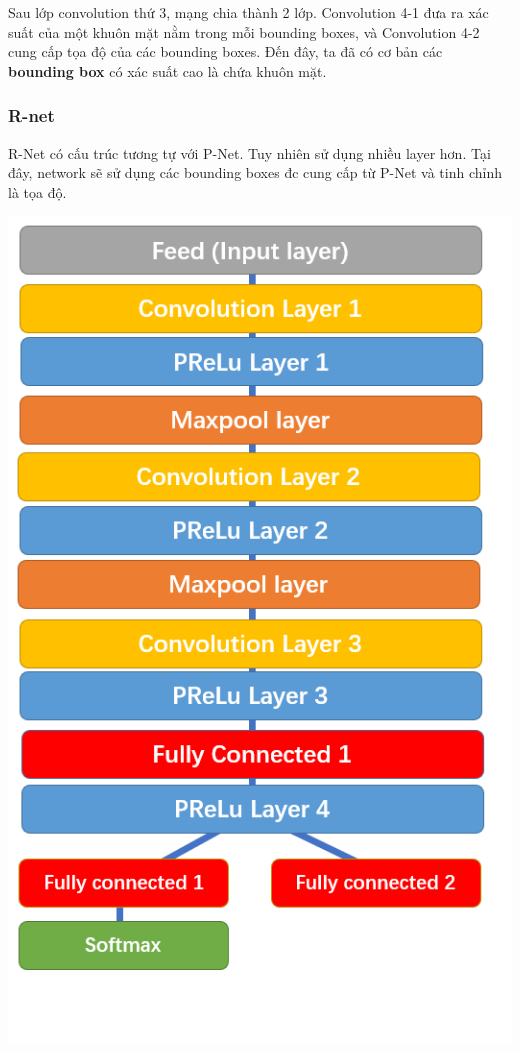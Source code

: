 \documentclass[12pt]{extreport}
\begin{document}
Sau lớp convolution thứ 3, mạng chia thành 2 lớp. Convolution 4-1 đưa ra xác suất của một khuôn mặt nằm trong mỗi bounding boxes, và Convolution 4-2 cung cấp tọa độ của các bounding boxes. Đến đây, ta đã có cơ bản các \textbf{bounding box} có xác suất cao là chứa khuôn mặt.

\newpage
\subsubsection{R-net}
R-Net có cấu trúc tương tự với P-Net. Tuy nhiên sử dụng nhiều layer hơn. Tại đây, network sẽ sử dụng các bounding boxes đc cung cấp từ P-Net và tinh chỉnh là tọa độ.

\begin{center}
\includegraphics[scale=0.5]{Image/MTCNN_R_net}
\end{center}
\end{document}
